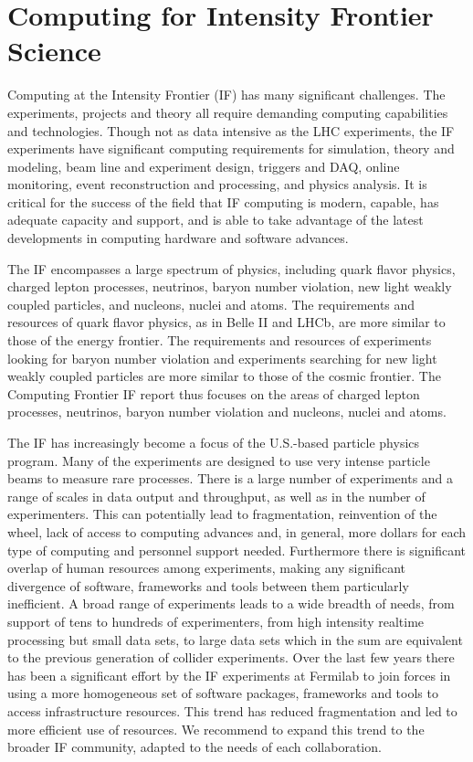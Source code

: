 \section{Computing for Intensity Frontier Science}

Computing at the Intensity Frontier (IF) has many significant challenges. The
experiments, projects and theory all require demanding computing capabilities
and technologies.  Though not as data intensive as the LHC experiments, the IF
experiments have significant computing requirements for simulation,  theory
and modeling, beam line and experiment design, triggers and DAQ, online
monitoring, event reconstruction and processing, and physics analysis.  It is
critical for the success of the field that IF computing is modern, capable,
has adequate capacity and support, and is able to take advantage of the latest
developments in computing hardware and software advances.

The IF encompasses a large spectrum of physics, including quark flavor
physics,  charged lepton processes, neutrinos, baryon number violation,  new
light weakly coupled particles, and nucleons, nuclei and atoms.  The
requirements and resources of quark flavor physics, as in Belle II and LHCb,
are more similar to those of the energy frontier. The requirements and
resources of  experiments looking for baryon number violation and  experiments
searching for new light weakly coupled particles are more similar to  those of the
cosmic frontier.  The Computing Frontier IF report thus focuses on the areas
of charged lepton processes,  neutrinos, baryon number violation and nucleons,
nuclei and atoms.

The IF has increasingly become a focus of the U.S.-based particle physics program. Many  of
the experiments are designed to use very intense particle beams to measure
rare processes. There is a large number of experiments and a range of scales
in data output and throughput, as well as in the number of experimenters.
This can potentially lead to fragmentation, reinvention of the wheel, lack of
access to computing advances and, in general, more dollars for each type of
computing and personnel support needed. Furthermore there is significant
overlap of human resources among experiments, making any significant
divergence of  software, frameworks and tools between them particularly
inefficient.  A broad range of experiments leads to a wide breadth of needs,
from support of tens to hundreds of experimenters, from high intensity
realtime processing but small data sets, to large data sets which in the sum
are equivalent to the previous generation of collider experiments. Over the
last few years there has been a significant effort by the IF experiments at
Fermilab to join forces in using a more homogeneous set of software packages,
frameworks and tools to access infrastructure resources. This trend has
reduced fragmentation and led to more efficient use of resources. We recommend
to expand this trend to the broader IF community, adapted to the needs of each
collaboration.

